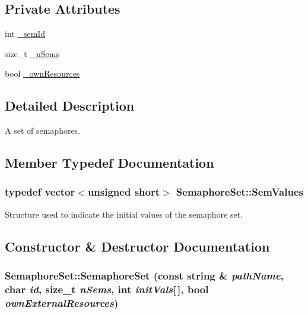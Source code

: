 \subsection*{Private Attributes}
\begin{CompactItemize}
\item 
int \hyperlink{classSemaphoreSet_8895b1fe81c6e0d0c7e25a50e80656a3}{\_\-semId}
\item 
size\_\-t \hyperlink{classSemaphoreSet_24a0a5557ae28121a031e228e0c3219a}{\_\-nSems}
\item 
bool \hyperlink{classSemaphoreSet_4756100f297c4163d7a89c27c7cd3e92}{\_\-ownResources}
\end{CompactItemize}


\subsection{Detailed Description}
A set of semaphores. 

\subsection{Member Typedef Documentation}
\hypertarget{classSemaphoreSet_9b4df28695eed6584fe24549b9f8c446}{
\subsubsection[{SemValues}]{\setlength{\rightskip}{0pt plus 5cm}typedef vector$<$unsigned short$>$ {\bf SemaphoreSet::SemValues}}}
\label{classSemaphoreSet_9b4df28695eed6584fe24549b9f8c446}


Structure used to indicate the initial values of the semaphore set. 

\subsection{Constructor \& Destructor Documentation}
\hypertarget{classSemaphoreSet_e7e1a5ffbb4649ea33100304d7c3c94c}{
\subsubsection[{SemaphoreSet}]{\setlength{\rightskip}{0pt plus 5cm}SemaphoreSet::SemaphoreSet (const string \& {\em pathName}, \/  char {\em id}, \/  size\_\-t {\em nSems}, \/  int {\em initVals}\mbox{[}$\,$\mbox{]}, \/  bool {\em ownExternalResources})}}
\label{classSemaphoreSet_e7e1a5ffbb4649ea33100304d7c3c94c}


